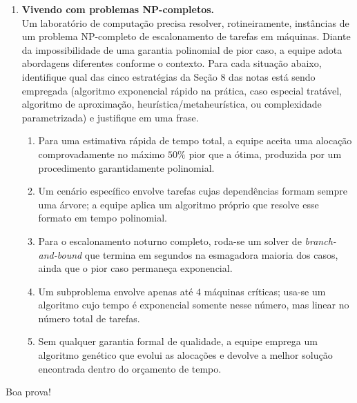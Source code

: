 \documentclass[10pt,a4paper]{extarticle}
\newcommand{\ntc}[1]{\textcolor{notice}{#1}}
\begin{document}
\begin{enumerate}[label=\textbf{\arabic*.}, itemsep=0.7cm, leftmargin=*]
\item \textbf{Vivendo com problemas NP-completos.} \\
Um laboratório de computação precisa resolver, rotineiramente, instâncias de um problema NP-completo de escalonamento de tarefas em máquinas. Diante da impossibilidade de uma garantia polinomial de pior caso, a equipe adota abordagens diferentes conforme o contexto. Para cada situação abaixo, identifique qual das cinco estratégias da Seção 8 das notas está sendo empregada (algoritmo exponencial rápido na prática, caso especial tratável, algoritmo de aproximação, heurística/metaheurística, ou complexidade parametrizada) e justifique em uma frase.

\begin{enumerate}[label=(\alph*)]
    \item Para uma estimativa rápida de tempo total, a equipe aceita uma alocação comprovadamente no máximo $50\%$ pior que a ótima, produzida por um procedimento garantidamente polinomial.
    \item Um cenário específico envolve tarefas cujas dependências formam sempre uma árvore; a equipe aplica um algoritmo próprio que resolve esse formato em tempo polinomial.
    \item Para o escalonamento noturno completo, roda-se um solver de \textit{branch-and-bound} que termina em segundos na esmagadora maioria dos casos, ainda que o pior caso permaneça exponencial.
    \item Um subproblema envolve apenas até $4$ máquinas críticas; usa-se um algoritmo cujo tempo é exponencial somente nesse número, mas linear no número total de tarefas.
    \item Sem qualquer garantia formal de qualidade, a equipe emprega um algoritmo genético que evolui as alocações e devolve a melhor solução encontrada dentro do orçamento de tempo.
\end{enumerate}

\end{enumerate}

\vfill
\begin{center}
\small\ntc{Boa prova!}
\end{center}
\end{document}
